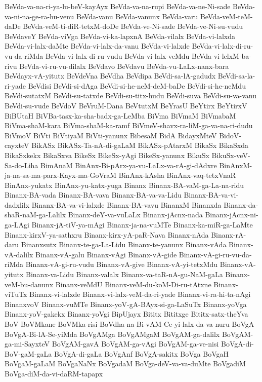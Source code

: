 {BeVda-va-na-ri-ya-lu-beV-kayAyx
BeVda-va-na-rupi
BeVda-va-ne-Ni-sade
BeVda-va-ni-na-ge-ra-hu-venu
BeVda-vanu
BeVda-vanunx
BeVda-varu
BeVda-veM-teM-daDe
BeVda-veM-ti-diR-tetxM-doDe
BeVda-ve-Ni-sade
BeVda-ve-Ni-su-vudu
BeVdaveY
BeVda-viVga
BeVda-vi-ka-lapxnA
BeVda-vilalx
BeVda-vi-lalxda
BeVda-vi-lalx-daMte
BeVda-vi-lalx-da-vanu
BeVda-vi-lalxde
BeVda-vi-lalx-di-ru-vu-da-riMda
BeVda-vi-lalx-di-ru-vudu
BeVda-vi-lalx-veMdu
BeVda-vi-lelxM-ba-rivu
BeVda-vi-ru-vu-dilalx
BeVdavo
BeVdavu
BeVda-vu-LaLx-nanx-bara
BeVdayx-vA-yitutx
BeVdeVna
BeVdha
BeVdipa
BeVdi-sa-lA-gadudx
BeVdi-sa-la-ri-yade
BeVdisi
BeVdi-si-dAga
BeVdi-si-he-neM-deM-baDe
BeVdi-si-he-neMdu
BeVdi-sutatxM
BeVdi-su-tatxde
BeVdi-su-titx-hudu
BeVdi-suva
BeVdi-su-va-vanu
BeVdi-su-vude
BeVdoV
BeVruM-Dana
BeVtutxM
BeYrasU
BeYtirx
BeYtirxV
BiBUtaH
BiVBa-tasx-ka-sha-badx-ga-LeMba
BiVma
BiVmaM
BiVmabaM
BiVma-shaM-kara
BiVma-shaM-ka-ramf
BiVmeV-shavx-ra-liM-ga-va-na-ri-dudu
BiVmoV
BiVti
BiVtiyaM
BiVti-yanunx
BibesaM
BidA
BidayxMteV
BidoV-cayxteV
BikASx
BikASx-Ta-nA-di-gaLaM
BikASx-pAtarxM
BikaSx
BikaSxda
BikaSxkekx
BikaSxva
BikeSx
BikeSx-yAgi
BikeSx-yanunx
BikuSx
BikuSx-veV-Sa-do-Liha
BimAnaM
BinAnx-Bi-pArx-ya-vu-LaLx-va-rA-gi-dAdxre
BinAnxM-ja-na-sa-ma-parx-Kayx-ma-GoVraM
BinAnx-kAsha
BinAnx-vaq-tetxVnaR
BinAnx-yukatx
BinAnx-yu-katx-yuga
Binanx
Binanx-BA-vaM-ga-La-na-ridu
Binanx-BA-vada
Binanx-BA-vava
Binanx-BA-va-va-Lidu
Binanx-BA-va-vi-dadxlilx
Binanx-BA-va-vi-lalxde
Binanx-BA-vavu
BinanxM
Binanxda
Binanx-da-shaR-naM-ga-Lalilx
Binanx-deY-va-vuLaLx
Binanx-jAcnx-nada
Binanx-jAcnx-ni-ga-LAgi
Binanx-jA-tiV-ya-mAgi
Binanx-ja-na-vuMTe
Binanx-ka-miR-ga-LaMte
Binanx-kirxV-ya-sathxru
Binanx-kirx-yA-paR-Nava
Binanx-nAda
Binanx-rA-daru
Binanxsutx
Binanx-te-ga-La-Lidu
Binanx-te-yanunx
Binanx-vAda
Binanx-vA-dalilx
Binanx-vA-galu
Binanx-vAgi
Binanx-vA-gide
Binanx-vA-gi-ru-vu-da-riMda
Binanx-vA-gi-ru-vudu
Binanx-vA-give
Binanx-vA-yi-tetxMdu
Binanx-vA-yitutx
Binanx-va-Lidu
Binanx-valalx
Binanx-va-taR-nA-gu-NaM-gaLa
Binanx-veM-bu-danunx
Binanx-veMdU
Binanx-veM-du-koM-Di-ru-tAtxne
Binanx-viTuTx
Binanx-vi-lalxde
Binanx-vi-lalx-veM-da-ri-yade
Binanx-vi-ra-hi-ta-nAgi
BinanxvoV
Binanx-vuMTe
Binanx-yoV-gA-BAyx-si-ga-LaSuTx
Binanx-yoVga
Binanx-yoV-gakekx
Binanx-yoVgi
BipUjayx
Bititx
Bititxge
Bititx-satx-theYva
BoV
BoVMkane
BoVMka-risi
BoVdha-na-Bi-vAM-Ce-yi-lalx-da-va-nuru
BoVgA
BoVgA-Bi-lA-Se-yiMda
BoVgAMga
BoVgAMgaM
BoVgAM-ga-dalilx
BoVgAM-ga-mi-SayxteV
BoVgAM-gavA
BoVgAM-ga-vAgi
BoVgAM-ga-ve-nisi
BoVgA-di-BoV-gaM-gaLa
BoVgA-di-gaLa
BoVgAnf
BoVgA-sakitx
BoVga
BoVgaH
BoVgaM-gaLaM
BoVgaNaNx
BoVgadaM
BoVga-deV-va-va-duMte
BoVgadiM
BoVga-diM-da-vi-daRM-tapapx
}
